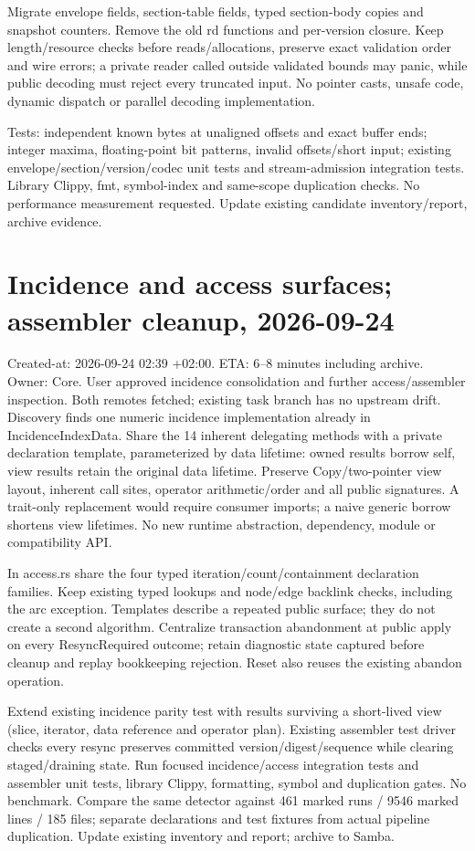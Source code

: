 \documentclass[11pt,a4paper]{article}
\begin{document}
Migrate envelope fields, section-table fields, typed section-body copies and
snapshot counters. Remove the old rd functions and per-version closure.
Keep length/resource checks before reads/allocations, preserve exact validation
order and wire errors; a private reader called outside validated bounds may
panic, while public decoding must reject every truncated input. No pointer
casts, unsafe code, dynamic dispatch or parallel decoding implementation.

Tests: independent known bytes at unaligned offsets and exact buffer ends;
integer maxima, floating-point bit patterns, invalid offsets/short input; existing
envelope/section/version/codec unit tests and stream-admission integration tests.
Library Clippy, fmt, symbol-index and same-scope duplication checks. No performance
measurement requested. Update existing candidate inventory/report, archive evidence.
\section*{Incidence and access surfaces; assembler cleanup, 2026-09-24}
Created-at: 2026-09-24 02:39 +02:00. ETA: 6--8 minutes including archive.
Owner: Core. User approved incidence consolidation and further access/assembler
inspection. Both remotes fetched; existing task branch has no upstream drift.
Discovery finds one numeric incidence implementation already in IncidenceIndexData.
Share the 14 inherent delegating methods with a private declaration template,
parameterized by data lifetime: owned results borrow self, view results retain the
original data lifetime. Preserve Copy/two-pointer view layout, inherent call sites,
operator arithmetic/order and all public signatures. A trait-only replacement
would require consumer imports; a naive generic borrow shortens view lifetimes.
No new runtime abstraction, dependency, module or compatibility API.

In access.rs share the four typed iteration/count/containment declaration families.
Keep existing typed lookups and node/edge backlink checks, including the arc
exception. Templates describe a repeated public surface; they do not create a
second algorithm. Centralize transaction abandonment at public apply on every
ResyncRequired outcome; retain diagnostic state captured before cleanup and replay
bookkeeping rejection. Reset also reuses the existing abandon operation.

Extend existing incidence parity test with results surviving a short-lived view
(slice, iterator, data reference and operator plan). Existing assembler test driver
checks every resync preserves committed version/digest/sequence while clearing
staged/draining state. Run focused incidence/access integration tests and assembler
unit tests, library Clippy, formatting, symbol and duplication gates. No benchmark.
Compare the same detector against 461 marked runs / 9546 marked lines / 185 files;
separate declarations and test fixtures from actual pipeline duplication. Update
existing inventory and report; archive to Samba.
\end{document}
